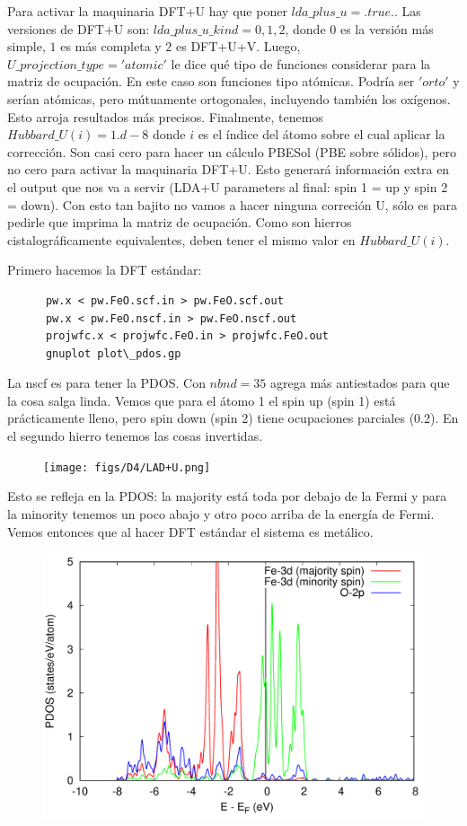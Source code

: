   Para activar la maquinaria DFT+U hay que poner $lda\_plus\_u = .true.$. Las versiones de DFT+U son: $lda\_plus\_u\_kind = 0,1,2$, donde $0$ es la versión más simple, $1$ es más completa y $2$ es DFT+U+V. Luego, $U\_projection\_type = 'atomic'$ le dice qué tipo de funciones considerar para la matriz de ocupación. En este caso son funciones tipo atómicas. Podría ser $'orto'$ y serían atómicas, pero mútuamente ortogonales, incluyendo también los oxígenos. Esto arroja resultados más precisos. Finalmente, tenemos $Hubbard\_U(i) = 1.d-8$ donde $i$ es el índice del átomo sobre el cual aplicar la corrección. Son casi cero para hacer un cálculo PBESol (PBE sobre sólidos), pero no cero para activar la maquinaria DFT+U. Esto generará información extra en el output que nos va a servir (LDA+U parameters al final: spin 1 = up y spin 2 = down). Con esto tan bajito no vamos a hacer ninguna correción U, sólo es para pedirle que imprima la matriz de ocupación. Como son hierros cistalográficamente equivalentes, deben tener el mismo valor en $Hubbard\_U(i)$.

  Primero hacemos la DFT estándar:
    \begin{verbatim}
      pw.x < pw.FeO.scf.in > pw.FeO.scf.out
      pw.x < pw.FeO.nscf.in > pw.FeO.nscf.out
      projwfc.x < projwfc.FeO.in > projwfc.FeO.out
      gnuplot plot\_pdos.gp
    \end{verbatim}

  La nscf es para tener la PDOS. Con $nbnd = 35$ agrega más antiestados para que la cosa salga linda. Vemos que para el átomo 1 el spin up (spin 1) está prácticamente lleno, pero spin down (spin 2) tiene ocupaciones parciales (0.2). En el segundo hierro tenemos las cosas invertidas.
    \begin{figure}[H]
        \centering
        \texttt{[image: figs/D4/LAD+U.png]}
    \end{figure}

  Esto se refleja en la PDOS: la majority está toda por debajo de la Fermi y para la minority tenemos un poco abajo y otro poco arriba de la energía de Fermi. Vemos entonces que al hacer DFT estándar el sistema es metálico.

  \begin{figure}[H]
      \centering
      \includegraphics[scale = 0.5]{figs/D4/FeO_pre.png}
  \end{figure}

